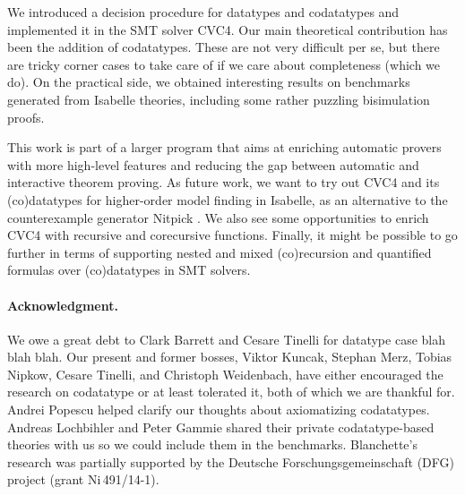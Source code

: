 We introduced a decision procedure for datatypes and codatatypes and implemented
it in the SMT solver CVC4. Our main theoretical contribution has been the
addition of codatatypes. These are not very difficult
per se, but there are tricky corner cases to take care of if we care about
completeness (which we do). On the practical side, we obtained interesting
results on benchmarks generated from Isabelle theories, including some rather
puzzling bisimulation proofs.

This work is part of a larger program that aims at enriching automatic
provers with more high-level features and reducing the gap between automatic and
interactive theorem proving. As future work, we want to try out CVC4 and its
(co)datatypes for higher-order model finding in Isabelle, as an
alternative to the counterexample generator Nitpick
\cite{blanchette-nipkow-2010}. We also see some opportunities to enrich CVC4
with recursive and corecursive functions. Finally, it might be possible to go
further in terms of supporting nested and mixed (co)recursion and quantified
formulas over (co)datatypes in SMT solvers.

\def\ackname{Acknowledgment}
\paragraph{\ackname.}
We owe a great debt to Clark Barrett and Cesare Tinelli for datatype case blah
blah blah.
%
Our present and former bosses, Viktor Kuncak, Stephan Merz, Tobias Nipkow,
Cesare Tinelli, and Christoph Weidenbach, have either encouraged the research on
codatatype or at least tolerated it, both of which we are thankful for.
%
Andrei Popescu helped clarify our thoughts about axiomatizing codatatypes.
Andreas Lochbihler and Peter Gammie shared their private codatatype-based
theories with us so we could include them in the benchmarks.
%
Blanchette's research was partially supported by the Deutsche
Forschungs\-gemein\-schaft (DFG) project
 (grant Ni\,491\slash 14-1).


{}


